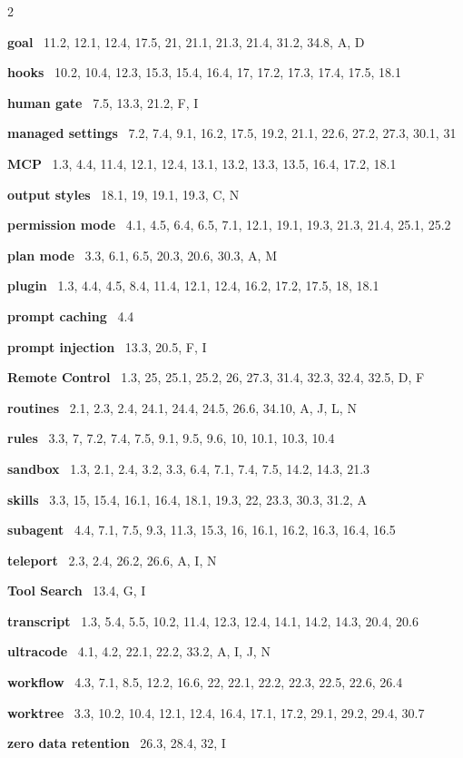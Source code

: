 \documentclass[11pt,a4paper,twoside,openany]{book}
\newenvironment{deflist}{%
  \begin{list}{}{%
    \setlength{\leftmargin}{6mm}\setlength{\itemindent}{-6mm}%
    \setlength{\listparindent}{0pt}\setlength{\labelwidth}{0pt}%
    \setlength{\labelsep}{0pt}\setlength{\topsep}{2mm}%
    \setlength{\itemsep}{0.9mm}\setlength{\parsep}{0pt}}}%
  {\end{list}}
\begin{document}
\begin{multicols}{2}
\begin{deflist}
\item \textbf{goal} \textemdash\ 11.2, 12.1, 12.4, 17.5, 21, 21.1, 21.3, 21.4, 31.2, 34.8, A, D  
\item \textbf{hooks} \textemdash\ 10.2, 10.4, 12.3, 15.3, 15.4, 16.4, 17, 17.2, 17.3, 17.4, 17.5, 18.1  
\item \textbf{human gate} \textemdash\ 7.5, 13.3, 21.2, F, I  
\item \textbf{managed settings} \textemdash\ 7.2, 7.4, 9.1, 16.2, 17.5, 19.2, 21.1, 22.6, 27.2, 27.3, 30.1, 31  
\item \textbf{MCP} \textemdash\ 1.3, 4.4, 11.4, 12.1, 12.4, 13.1, 13.2, 13.3, 13.5, 16.4, 17.2, 18.1  
\item \textbf{output styles} \textemdash\ 18.1, 19, 19.1, 19.3, C, N  
\item \textbf{permission mode} \textemdash\ 4.1, 4.5, 6.4, 6.5, 7.1, 12.1, 19.1, 19.3, 21.3, 21.4, 25.1, 25.2  
\item \textbf{plan mode} \textemdash\ 3.3, 6.1, 6.5, 20.3, 20.6, 30.3, A, M  
\item \textbf{plugin} \textemdash\ 1.3, 4.4, 4.5, 8.4, 11.4, 12.1, 12.4, 16.2, 17.2, 17.5, 18, 18.1  
\item \textbf{prompt caching} \textemdash\ 4.4  
\item \textbf{prompt injection} \textemdash\ 13.3, 20.5, F, I  
\item \textbf{Remote Control} \textemdash\ 1.3, 25, 25.1, 25.2, 26, 27.3, 31.4, 32.3, 32.4, 32.5, D, F  
\item \textbf{routines} \textemdash\ 2.1, 2.3, 2.4, 24.1, 24.4, 24.5, 26.6, 34.10, A, J, L, N  
\item \textbf{rules} \textemdash\ 3.3, 7, 7.2, 7.4, 7.5, 9.1, 9.5, 9.6, 10, 10.1, 10.3, 10.4  
\item \textbf{sandbox} \textemdash\ 1.3, 2.1, 2.4, 3.2, 3.3, 6.4, 7.1, 7.4, 7.5, 14.2, 14.3, 21.3  
\item \textbf{skills} \textemdash\ 3.3, 15, 15.4, 16.1, 16.4, 18.1, 19.3, 22, 23.3, 30.3, 31.2, A  
\item \textbf{subagent} \textemdash\ 4.4, 7.1, 7.5, 9.3, 11.3, 15.3, 16, 16.1, 16.2, 16.3, 16.4, 16.5  
\item \textbf{teleport} \textemdash\ 2.3, 2.4, 26.2, 26.6, A, I, N  
\item \textbf{Tool Search} \textemdash\ 13.4, G, I  
\item \textbf{transcript} \textemdash\ 1.3, 5.4, 5.5, 10.2, 11.4, 12.3, 12.4, 14.1, 14.2, 14.3, 20.4, 20.6  
\item \textbf{ultracode} \textemdash\ 4.1, 4.2, 22.1, 22.2, 33.2, A, I, J, N  
\item \textbf{workflow} \textemdash\ 4.3, 7.1, 8.5, 12.2, 16.6, 22, 22.1, 22.2, 22.3, 22.5, 22.6, 26.4  
\item \textbf{worktree} \textemdash\ 3.3, 10.2, 10.4, 12.1, 12.4, 16.4, 17.1, 17.2, 29.1, 29.2, 29.4, 30.7  
\item \textbf{zero data retention} \textemdash\ 26.3, 28.4, 32, I  
\end{deflist}
\end{multicols}
\end{document}
